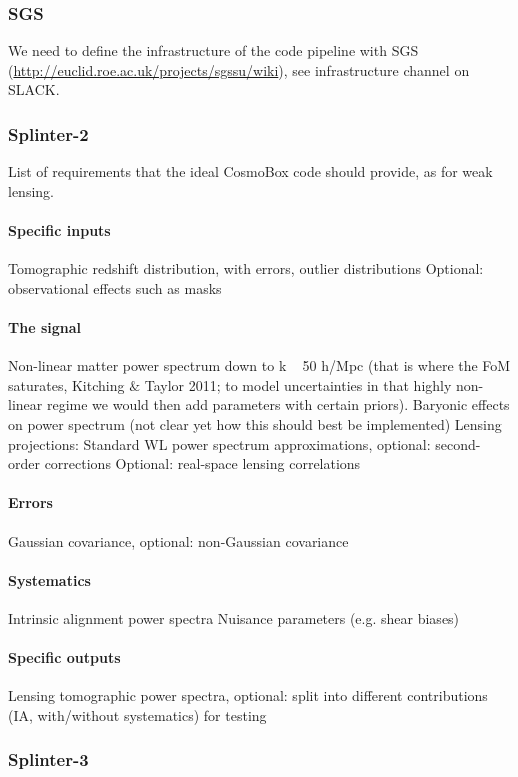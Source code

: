 \subsubsection{SGS}
We need to define the infrastructure of the code pipeline with SGS (\url{http://euclid.roe.ac.uk/projects/sgssu/wiki}), see infrastructure channel on SLACK.


\subsubsection{Splinter-2}
List of requirements that the ideal CosmoBox code should provide, as for weak lensing.

\paragraph{Specific inputs}
Tomographic redshift distribution, with errors, outlier distributions
Optional: observational effects such as masks
\paragraph{The signal}
Non-linear matter power spectrum down to k ~ 50 h/Mpc (that is where the FoM saturates, Kitching $\&$ Taylor 2011; to model uncertainties in that highly non-linear regime we would then add parameters with certain priors).
Baryonic effects on power spectrum (not clear yet how this should best be implemented) 
Lensing projections: Standard WL power spectrum approximations, optional: second-order corrections
Optional: real-space lensing correlations
\paragraph{Errors}
Gaussian covariance, optional: non-Gaussian covariance
\paragraph{Systematics}
Intrinsic alignment power spectra
Nuisance parameters (e.g. shear biases)

\paragraph{Specific outputs}
Lensing tomographic power spectra, optional: split into different contributions (IA, with/without systematics) for testing


\subsubsection{Splinter-3}

